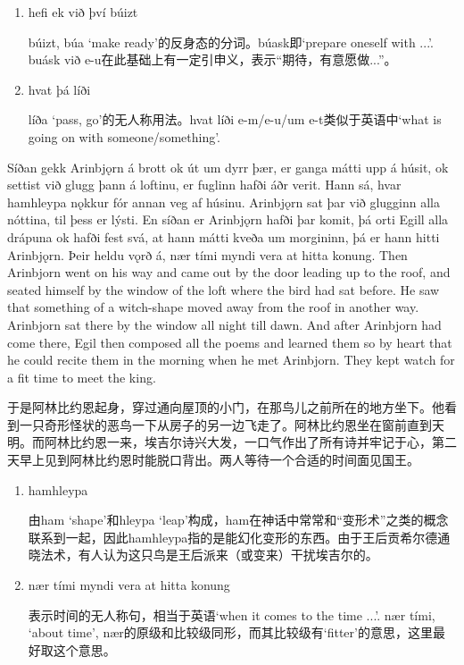 \begin{grammar*}{}
    \begin{enumerate}[leftmargin=*]
        \item hefi ek við því búizt

              búizt, búa `make ready'的反身态的分词。búask即`prepare oneself with ...'. buásk við e-u在此基础上有一定引申义，表示“期待，有意愿做...”。

        \item hvat þá líði

              líða `pass, go'的无人称用法。hvat líði e-m/e-u/um e-t类似于英语中`what is going on with someone/something'.

    \end{enumerate}
\end{grammar*}
\begin{paracol}{2}
    Síðan gekk Arinbjǫrn á brott ok út um dyrr þær, er ganga mátti upp á húsit, ok settist við glugg þann á loftinu, er fuglinn hafði áðr verit. Hann sá, hvar hamhleypa nǫkkur fór annan veg af húsinu. Arinbjǫrn sat þar við glugginn alla nóttina, til þess er lýsti. En síðan er Arinbjǫrn hafði þar komit, þá orti Egill alla drápuna ok hafði fest svá, at hann mátti kveða um morgininn, þá er hann hitti Arinbjǫrn. Þeir heldu vǫrð á, nær tími myndi vera at hitta konung.
    \switchcolumn
    Then Arinbjorn went on his way and came out by the door leading up to the roof, and seated himself by the window of the loft where the bird had sat before. He saw that something of a witch-shape moved away from the roof in another way. Arinbjorn sat there by the window all night till dawn. And after Arinbjorn had come there, Egil then composed all the poems and learned them so by heart that he could recite them in the morning when he met Arinbjorn. They kept watch for a fit time to meet the king.
\end{paracol}

\begin{translation*}{}
    于是阿林比约恩起身，穿过通向屋顶的小门，在那鸟儿之前所在的地方坐下。他看到一只奇形怪状的恶鸟一下从房子的另一边飞走了。阿林比约恩坐在窗前直到天明。而阿林比约恩一来，埃吉尔诗兴大发，一口气作出了所有诗并牢记于心，第二天早上见到阿林比约恩时能脱口背出。两人等待一个合适的时间面见国王。
\end{translation*}
\begin{grammar*}{}
    \begin{enumerate}[leftmargin=*]
        \item hamhleypa

              由ham `shape'和hleypa `leap'构成，ham在神话中常常和“变形术”之类的概念联系到一起，因此hamhleypa指的是能幻化变形的东西。由于王后贡希尔德通晓法术，有人认为这只鸟是王后派来（或变来）干扰埃吉尔的。

        \item nær tími myndi vera at hitta konung

              表示时间的无人称句，相当于英语`when it comes to the time ...'. nær tími, `about time', nær的原级和比较级同形，而其比较级有`fitter'的意思，这里最好取这个意思。
    \end{enumerate}
\end{grammar*}

